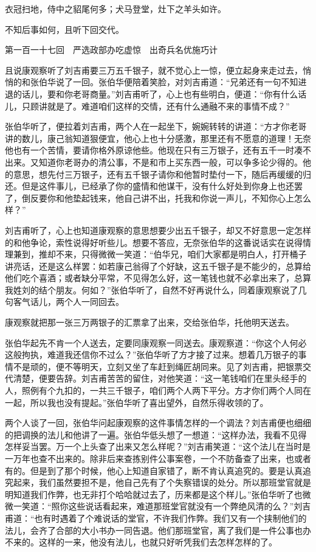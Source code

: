 \documentclass[12pt,UTF8]{ctexbook}
\begin{document}
{{{衣冠扫地，侍中之貂尾何多；犬马登堂，灶下之羊头如许。

不知后事如何，且听下回交代。





第一百一十七回　严选政部办吃虚惊　出奇兵名优施巧计





且说康观察听了刘吉甫要三万五千银子，就不觉心上一惊，便立起身来走过去，悄悄的和张伯华说了一回。张伯华便陪着笑脸，对刘吉甫道：“兄弟还有一句不知进退的话儿，要和你老哥商量。”刘吉甫听了，心上也有些明白，便道：“你有什么话儿，只顾讲就是了。难道咱们这样的交情，还有什么通融不来的事情不成？”

张伯华听了，便拉着刘吉甫，两个人在一起坐下，婉婉转转的讲道：“方才你老哥讲的数儿，康己翁知道狠便宜，他心上也十分感激，那里还有不愿意的道理！无奈他也有一个苦情，要请你格外原谅他些。他现在只有三万银子，还有五千一时凑不出来。又知道你老哥办的清公事，不是和市上买东西一般，可以争多论少得的。他的意思，想先付三万银子，还有五千银子请你和他暂时垫付一下，随后再缓缓的归还。但是这件事儿，已经承了你的盛情和他谋干，没有什么好处到你身上也还罢了，倒反要你和他垫起钱来，他自己讲不出，托我和你说一声儿，不知你心上怎么样？”

刘吉甫听了，心上也知道康观察的意思想要少出五千银子，却又不好意思一定怎样的和他争论，索性说得好听些儿。想要不答应，无奈张伯华的这番说话实在说得情理兼到，推却不来，只得微微一笑道：“伯华兄，咱们大家都是明白人，打开桶子讲亮话，还是这么样罢：如若康己翁得了个好缺，这五千银子是不能少的，总算给他们吃个喜酒；或者缺分平常，不见得怎么好，这一笔钱也就不必拿出来了，总算我姓刘的结个朋友。何如？”张伯华听了，自然不好再说什么，同着康观察说了几句客气话儿，两个人一同回去。

康观察就把那一张三万两银子的汇票拿了出来，交给张伯华，托他明天送去。

张伯华起先不肯一个人送去，定要同康观察一同送去。康观察道：“你这个人何必这般拘执，难道我还信你不过么？”张伯华听了方才接了过来。想着几万银子的事情不是顽的，便不等明天，立刻又坐了车赶到绳匠胡同来。见了刘吉甫，把银票交代清楚，便要告辞。刘吉甫苦苦的留住，对他笑道：“这一笔钱咱们在里头经手的人，照例有个九扣的，一共三千银子，咱们两个人两下平分。方才你们两个人同在一起，所以我也没有提起。”张伯华听了喜出望外，自然乐得收领的了。

两个人谈了一回，张伯华问起康观察的这件事情怎样的一个调法？刘吉甫便也细细的把调换的法儿和他讲了一遍。张伯华低头想了一想道：“这样办法，我看不见得怎样妥当罢。万一个上头查了出来又怎么样呢？”刘吉甫笑道：“这个法儿在当时是一万年也查不出来的。除非后来查拣别件公事案卷，一个不防备查了出来，也或者有的。但是到了那个时候，他心上知道自家错了，断不肯认真追究的。要是认真追究起来，我们虽然要担不是，他自己先有了个失察错误的处分。所以那班堂官就是明知道我们作弊，也无非打个哈哈就过去了，历来都是这个样儿。”张伯华听了也微微一笑道：“照你这些说话看起来，难道那班堂官就没有一个弊绝风清的么？”刘吉甫道：“也有时遇着了个难说话的堂官，不许我们作弊。我们又有一个挟制他们的法儿，会齐了合部的大小书办一同告退。他们那班堂官，离了我们是一件公事也办不来的。这样的一来，他没有法儿，也就只好听凭我们去怎样怎样的了。

}}}
\end{document}

